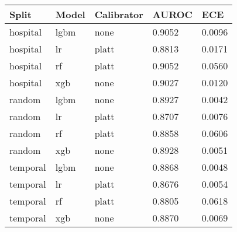 \begin{tabular}{lllll}
\toprule
Split & Model & Calibrator & AUROC & ECE \\
\midrule
hospital & lgbm & none & 0.9052 & 0.0096 \\
hospital & lr & platt & 0.8813 & 0.0171 \\
hospital & rf & platt & 0.9052 & 0.0560 \\
hospital & xgb & none & 0.9027 & 0.0120 \\
random & lgbm & none & 0.8927 & 0.0042 \\
random & lr & platt & 0.8707 & 0.0076 \\
random & rf & platt & 0.8858 & 0.0606 \\
random & xgb & none & 0.8928 & 0.0051 \\
temporal & lgbm & none & 0.8868 & 0.0048 \\
temporal & lr & platt & 0.8676 & 0.0054 \\
temporal & rf & platt & 0.8805 & 0.0618 \\
temporal & xgb & none & 0.8870 & 0.0069 \\
\bottomrule
\end{tabular}
